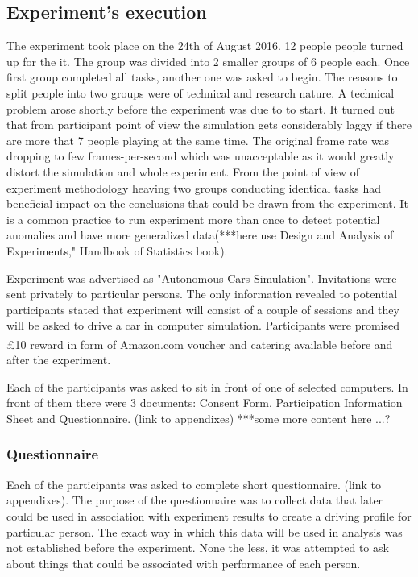 \documentclass[11pt,english,twoside]{article}
\begin{document}
\subsection{Experiment's execution}

The experiment took place on the 24th of August 2016. 12 people people turned up for the it. The group was divided into 2 smaller groups of 6 people each. Once first group completed all tasks, another one was asked to begin. The reasons to split people into two groups were of technical and research nature. A technical problem arose shortly before the experiment was due to to start. It turned out that from participant point of view the simulation gets considerably laggy if there are more that 7 people playing at the same time. The original frame rate was dropping to few frames-per-second which was unacceptable as it would greatly distort the simulation and whole experiment. From the point of view of experiment methodology heaving two groups conducting identical tasks had beneficial impact on the conclusions that could be drawn from the experiment. It is a common practice to run experiment more than once to detect potential anomalies and have more generalized data(***here use Design and Analysis of Experiments," Handbook of Statistics book).





Experiment was advertised as "Autonomous Cars Simulation". Invitations were sent privately to particular persons. The only information revealed to potential participants stated that experiment will consist of a couple of sessions and they will be asked to drive a car in computer simulation. Participants were promised £10 reward in form of Amazon.com\textsuperscript{\textregistered} voucher and catering available before and after the experiment.


Each of the participants was asked to sit in front of one of selected computers. In front of them there were 3 documents: Consent Form, Participation Information Sheet and Questionnaire. (link to appendixes)
***some more content here
...?

\subsubsection{Questionnaire}

Each of the participants was asked to complete short questionnaire. (link to appendixes). The purpose of the questionnaire was to collect data that later could be used in association with experiment results to create a driving profile for particular person. The exact way in which this data will be used in analysis was not established before the experiment. None the less, it was attempted to ask about things that could be associated with performance of each person.
\end{document}
